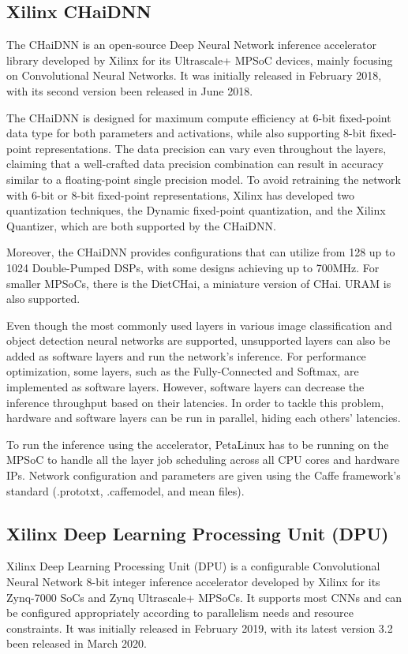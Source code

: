 \subsection{Xilinx CHaiDNN}
The CHaiDNN \cite{CHaiDNN-GitHub} is an open-source Deep Neural Network inference accelerator library developed by Xilinx for its Ultrascale+ MPSoC devices, mainly focusing on Convolutional Neural Networks. It was initially released in February 2018, with its second version been released in June 2018.

The CHaiDNN is designed for maximum compute efficiency at 6-bit fixed-point data type for both parameters and activations, while also supporting 8-bit fixed-point representations. The data precision can vary even throughout the layers, claiming that a well-crafted data precision combination can result in accuracy similar to a floating-point single precision model. To avoid retraining the network with 6-bit or 8-bit fixed-point representations, Xilinx has developed two quantization techniques, the Dynamic fixed-point quantization, and the Xilinx Quantizer, which are both supported by the CHaiDNN.

Moreover, the CHaiDNN provides configurations that can utilize from 128 up to 1024 Double-Pumped DSPs, with some designs achieving up to 700MHz. For smaller MPSoCs, there is the DietCHai, a miniature version of CHai. URAM is also supported.

Even though the most commonly used layers in various image classification and object detection neural networks are supported, unsupported layers can also be added as software layers and run the network's inference. For performance optimization, some layers, such as the Fully-Connected and Softmax, are implemented as software layers. However, software layers can decrease the inference throughput based on their latencies. In order to tackle this problem, hardware and software layers can be run in parallel, hiding each others' latencies.

To run the inference using the accelerator, PetaLinux has to be running on the MPSoC to handle all the layer job scheduling across all CPU cores and hardware IPs. Network configuration and parameters are given using the Caffe framework's standard (.prototxt, .caffemodel, and mean files).

\subsection{Xilinx Deep Learning Processing Unit (DPU)}
Xilinx Deep Learning Processing Unit (DPU) \cite{PG338-Zynq-DPU-IP-Product-Guide} is a configurable Convolutional Neural Network 8-bit integer inference accelerator developed by Xilinx for its Zynq-7000 SoCs and Zynq Ultrascale+ MPSoCs. It supports most CNNs and can be configured appropriately according to parallelism needs and resource constraints. It was initially released in February 2019, with its latest version 3.2 been released in March 2020.

